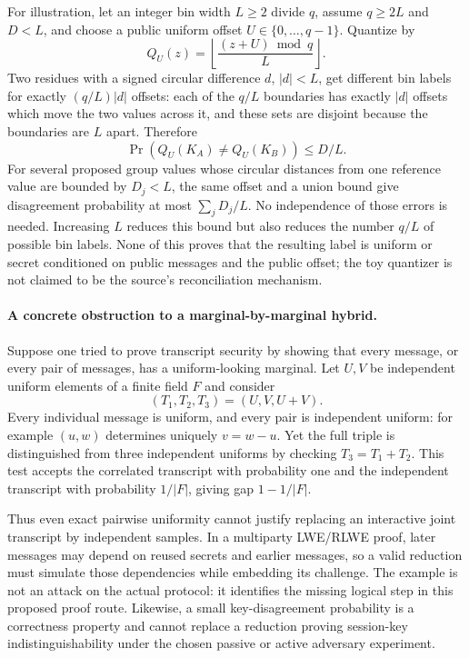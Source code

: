 \documentclass[11pt]{article}
\begin{document}
For illustration, let an integer bin width $L\ge2$ divide $q$, assume $q\ge2L$ and $D<L$, and choose a public uniform offset $U\in\{0,\ldots,q-1\}$. Quantize by
\[
 Q_U(z)=\left\lfloor\frac{(z+U)\bmod q}{L}\right\rfloor.
\]
Two residues with a signed circular difference $d$, $|d|<L$, get different bin labels for exactly $(q/L)|d|$ offsets: each of the $q/L$ boundaries has exactly $|d|$ offsets which move the two values across it, and these sets are disjoint because the boundaries are $L$ apart. Therefore
\[
 \Pr(Q_U(K_A)\ne Q_U(K_B))\le D/L.
\]
For several proposed group values whose circular distances from one reference value are bounded by $D_j<L$, the same offset and a union bound give disagreement probability at most $\sum_jD_j/L$. No independence of those errors is needed. Increasing $L$ reduces this bound but also reduces the number $q/L$ of possible bin labels. None of this proves that the resulting label is uniform or secret conditioned on public messages and the public offset; the toy quantizer is not claimed to be the source's reconciliation mechanism.

\paragraph{A concrete obstruction to a marginal-by-marginal hybrid.}
Suppose one tried to prove transcript security by showing that every message, or every pair of messages, has a uniform-looking marginal. Let $U,V$ be independent uniform elements of a finite field $F$ and consider
\[
 (T_1,T_2,T_3)=(U,V,U+V).
\]
Every individual message is uniform, and every pair is independent uniform: for example $(u,w)$ determines uniquely $v=w-u$. Yet the full triple is distinguished from three independent uniforms by checking $T_3=T_1+T_2$. This test accepts the correlated transcript with probability one and the independent transcript with probability $1/|F|$, giving gap $1-1/|F|$.

Thus even exact pairwise uniformity cannot justify replacing an interactive joint transcript by independent samples. In a multiparty LWE/RLWE proof, later messages may depend on reused secrets and earlier messages, so a valid reduction must simulate those dependencies while embedding its challenge. The example is not an attack on the actual protocol: it identifies the missing logical step in this proposed proof route. Likewise, a small key-disagreement probability is a correctness property and cannot replace a reduction proving session-key indistinguishability under the chosen passive or active adversary experiment.
\end{document}
